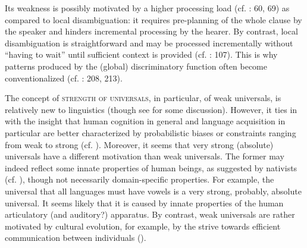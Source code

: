 \documentclass[output=paper]{langsci/langscibook}
\begin{document}
Its weakness is possibly motivated by a higher processing load (cf. \citealt{Hawkins2014_CompMot}: 60, 69) as compared to local disambiguation: it requires pre-planning of the whole clause by the speaker and hinders incremental processing by the hearer. By contrast, local disambiguation is straightforward and may be processed incrementally without “having to wait” until sufficient context is provided (cf. \citealt{Bornkessel-SchlesewskySchlesewsky2014}: 107). This is why patterns produced by the (global) discriminatory function often become conventionalized (cf. \citealt{Aissen2003,ZeevatJäger2002,Jäger2004,Malchukov2008}: 208, 213).

The concept of \textsc{strength of universals}, in particular, of weak universals, is relatively new to linguistics (though see \citealt{Bickel2013} for some discussion). However, it ties in with the insight that human cognition in general and language acquisition in particular are better characterized by probabilistic biases or constraints ranging from weak to strong (cf. \citealt{ThompsonEtAl2016}). Moreover, it seems that very strong (absolute) universals have a different motivation than weak universals. The former may indeed reflect some innate properties of human beings, as suggested by nativists (cf. \citealt{Chomsky1965}), though not necessarily domain-specific properties. For example, the universal that all languages must have vowels \citep[19]{Comrie1989} is a very strong, probably, absolute universal. It seems likely that it is caused by innate properties of the human articulatory (and auditory?) apparatus. By contrast, weak universals are rather motivated by cultural evolution, for example, by the strive towards efficient communication between individuals (). 
\newpage
\end{document}
